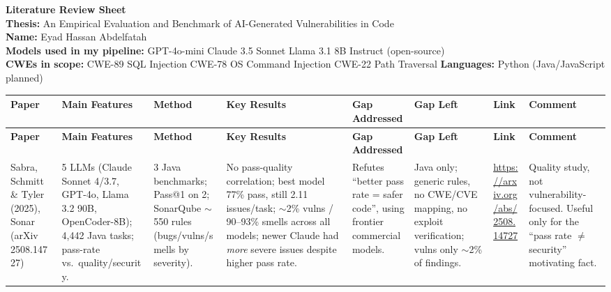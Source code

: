 \documentclass[10pt]{article}
\begin{document}
\begin{landscape}
\footnotesize

\begin{center}
{\Large \textbf{Literature Review Sheet}}\\[4pt]
\textbf{Thesis:} An Empirical Evaluation and Benchmark of AI-Generated Vulnerabilities in Code\\
\textbf{Name:} Eyad Hassan Abdelfatah\\[4pt]
\textbf{Models used in my pipeline:} GPT-4o-mini \textbar{} Claude 3.5 Sonnet \textbar{} Llama 3.1 8B Instruct (open-source)\\
\textbf{CWEs in scope:} CWE-89 SQL Injection \textbar{} CWE-78 OS Command Injection \textbar{} CWE-22 Path Traversal \quad
\textbf{Languages:} Python (Java/JavaScript planned)
\end{center}
\vspace{6pt}

\begin{longtable}{
  P{2.6cm}
  P{3.6cm}
  P{3.2cm}
  P{4.0cm}
  P{3.0cm}
  P{3.0cm}
  P{2.2cm}
  P{3.6cm}
}
\toprule
\textbf{Paper} & \textbf{Main Features} & \textbf{Method} & \textbf{Key Results} & \textbf{Gap Addressed} & \textbf{Gap Left} & \textbf{Link} & \textbf{Comment} \\
\midrule
\endfirsthead

\toprule
\textbf{Paper} & \textbf{Main Features} & \textbf{Method} & \textbf{Key Results} & \textbf{Gap Addressed} & \textbf{Gap Left} & \textbf{Link} & \textbf{Comment} \\
\midrule
\endhead

\bottomrule
\endfoot

\bottomrule
\endlastfoot

Sabra, Schmitt \& Tyler (2025), Sonar (arXiv 2508.14727)
&
5 LLMs (Claude Sonnet 4/3.7, GPT-4o, Llama 3.2 90B, OpenCoder-8B); 4{,}442 Java tasks; pass-rate vs.\ quality/security.
&
3 Java benchmarks; Pass@1 on 2; SonarQube $\sim$550 rules (bugs/vulns/smells by severity).
&
No pass-quality correlation; best model 77\% pass, still 2.11 issues/task; $\sim$2\% vulns / 90--93\% smells across all models; newer Claude had \emph{more} severe issues despite higher pass rate.
&
Refutes ``better pass rate = safer code'', using frontier commercial models.
&
Java only; generic rules, no CWE/CVE mapping, no exploit verification; vulns only $\sim$2\% of findings.
&
\url{https://arxiv.org/abs/2508.14727}
&
Quality study, not vulnerability-focused. Useful only for the ``pass rate $\neq$ security'' motivating fact.
\\[4pt]


\end{longtable}
\end{landscape}
\end{document}
